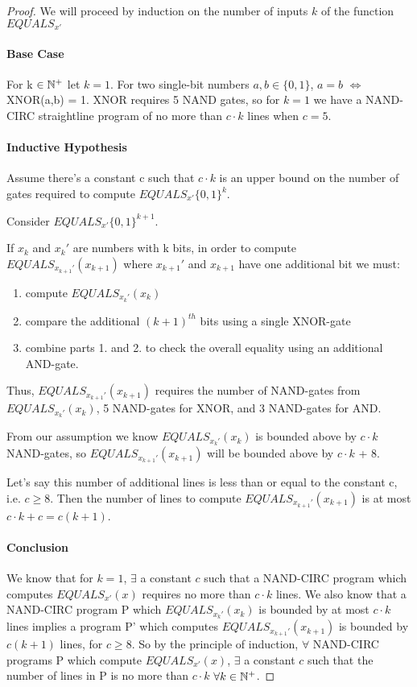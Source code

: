 \documentclass[11pt]{article}
\begin{document}
\begin{proof} 
We will proceed by induction on the number of inputs $k$ of the function $EQUALS_{x'}$ 

\paragraph{Base Case}
For k $\in \mathbb{N}^+$ let $k=1$.
For two single-bit numbers $a, b \in \{0,1\}$, $a = b$ $\iff$ XNOR(a,b) = 1. XNOR requires 5 NAND gates, so for $k=1$ we have a NAND-CIRC straightline program of no more than $c\cdot k$ lines when $c = 5$.
\paragraph{Inductive Hypothesis}
Assume there’s a constant c such that $c \cdot k$ is an upper bound on the number of gates required to compute $EQUALS_{x'} \{0,1\}^{k}$. 

Consider $EQUALS_{x'} \{0,1\}^{k+1}$.

If $x_{k}$ and $x_{k}'$ are numbers with k bits, in order to compute $EQUALS_{x_{k+1}'}(x_{k+1})$ where $x_{k+1}'$ and $x_{k+1}$ have one additional bit we must:
\begin{enumerate}
    \item compute $EQUALS_{x_{k}'}(x_{k})$
    \item compare the additional $(k+1)^{th}$ bits using a single XNOR-gate
    \item combine parts 1. and 2. to check the overall equality using an additional AND-gate. 
\end{enumerate}
Thus, $EQUALS_{x_{k+1}'}(x_{k+1})$ requires the number of NAND-gates from $EQUALS_{x_{k}'}(x_{k})$, 5 NAND-gates for XNOR, and 3 NAND-gates for AND.



From our assumption we know $EQUALS_{x_{k}'}(x_{k})$ is bounded above by $c \cdot k$ NAND-gates, so $EQUALS_{x_{k+1}'}(x_{k+1})$ will be bounded above by $c \cdot k$ + 8.

Let’s say this number of additional lines is less than or equal to the constant c, i.e. $c \geq 8$. Then the number of lines to compute $EQUALS_{x_{k+1}'}(x_{k+1})$ is at most $c \cdot k + c = c(k+1)$.

\paragraph{Conclusion}
We know that for $k = 1$, $\exists$ a constant $c$ such that a NAND-CIRC program which computes $EQUALS_{x'}(x)$ requires no more than $c \cdot k$ lines. We also know that a NAND-CIRC program P which $EQUALS_{x_{k}'}(x_{k})$ is bounded by at most $c \cdot k$ lines implies a program P' which computes $EQUALS_{x_{k+1}'}(x_{k+1})$ is bounded by $c(k+1)$ lines, for $c \geq 8$.
So by the principle of induction, $\forall$ NAND-CIRC programs P which compute $EQUALS_{x'}(x)$, $\exists$ a constant $c$ such that the number of lines in P is no more than $c \cdot k$ $\forall k \in \mathbb{N}^+$.

\end{proof}
\end{document}
